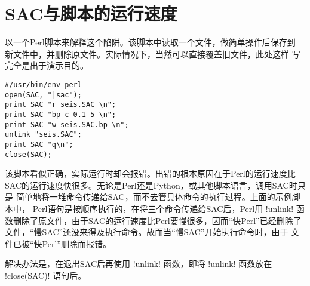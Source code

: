 \section{SAC与脚本的运行速度}
以一个Perl脚本来解释这个陷阱。该脚本中读取一个文件，做简单操作后保存到
新文件中，并删除原文件。实际情况下，当然可以直接覆盖旧文件，此处这样
写完全是出于演示目的。
\begin{verbatim}
#/usr/bin/env perl
open(SAC, "|sac");
print SAC "r seis.SAC \n";
print SAC "bp c 0.1 5 \n";
print SAC "w seis.SAC.bp \n";
unlink "seis.SAC";
print SAC "q\n";
close(SAC);
\end{verbatim}
该脚本看似正确，实际运行时却会报错。出错的根本原因在于Perl的运行速度比
SAC的运行速度快很多。无论是Perl还是Python，或其他脚本语言，调用SAC时只是
简单地将一堆命令传递给SAC，而不去管具体命令的执行过程。上面的示例脚本中，
Perl语句是按顺序执行的，在将三个命令传递给SAC后，Perl用 !unlink!
函数删除了原文件，由于SAC的运行速度比Perl要慢很多，因而``快Perl''已经删除了
文件，``慢SAC''还没来得及执行命令。故而当``慢SAC''开始执行命令时，由于
文件已被``快Perl''删除而报错。

解决办法是，在退出SAC后再使用 !unlink! 函数，即将 !unlink!
函数放在 !close(SAC)! 语句后。
